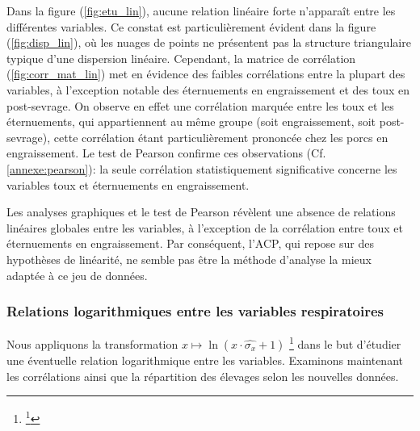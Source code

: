 \documentclass{article}
\begin{document}
Dans la figure (\ref{fig:etu_lin}), aucune relation linéaire forte n’apparaît entre les différentes variables. Ce constat est particulièrement évident dans la figure (\ref{fig:disp_lin}), où les nuages de points ne présentent pas la structure triangulaire typique d’une dispersion linéaire.
Cependant, la matrice de corrélation (\ref{fig:corr_mat_lin}) met en évidence des faibles corrélations entre la plupart des variables, à l’exception notable des éternuements en engraissement et des toux en post-sevrage. On observe en effet une corrélation marquée entre les toux et les éternuements, qui appartiennent au même groupe (soit engraissement, soit post-sevrage), cette corrélation étant particulièrement prononcée chez les porcs en engraissement.
Le test de Pearson confirme ces observations (Cf.\text{ }\ref{annexe:pearson}): la seule corrélation statistiquement significative concerne les variables toux et éternuements en engraissement.

Les analyses graphiques et le test de Pearson révèlent une absence de relations linéaires globales entre les variables, à l'exception de la corrélation entre toux et éternuements en engraissement. Par conséquent, l'ACP, qui repose sur des hypothèses de linéarité, ne semble pas être la méthode d'analyse la mieux adaptée à ce jeu de données.


\subsubsection{Relations logarithmiques entre les variables respiratoires}
Nous appliquons la transformation $x \longmapsto \ln(x \cdot \hat{{\sigma_x}} + 1)$
\footnote{\footnote{Nous utilisons la transformation \( x \longmapsto \ln(x \cdot \hat{{\sigma_x}} + 1) \) plutôt que \( x \longmapsto \ln(x) \cdot \hat{{\sigma_x}} \) afin de tenir compte de la présence de zéros dans nos données, tout en conservant une fonction bien définie. Le facteur \( \text{sd}(x) \) (écart-type) est ajouté pour normaliser les données, en atténuant l'effet des différences de dispersion entre les variables, ce qui permet de stabiliser la variance et de rendre les données plus comparables. Cette approche est donc appropriée, car elle garantit des valeurs positives et améliore la gestion de la variabilité dans les données.}
}
 dans le but d'étudier une éventuelle relation logarithmique entre les variables.
Examinons maintenant les corrélations ainsi que la répartition des élevages selon les nouvelles données.

\newpage
\end{document}
